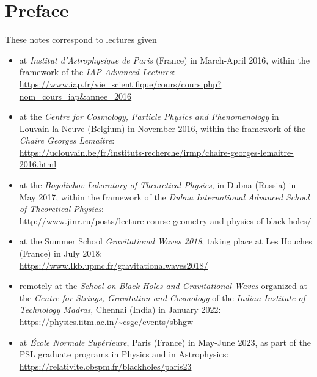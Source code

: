 \chapter*{Preface}

These notes correspond to lectures given
\begin{itemize}
\item at \emph{Institut d'Astrophysique de Paris} (France) in March-April 2016, within the
framework of the \emph{IAP Advanced Lectures}:\\
{\footnotesize\url{https://www.iap.fr/vie_scientifique/cours/cours.php?nom=cours_iap&annee=2016}}
\item at the \emph{Centre for Cosmology, Particle Physics and Phenomenology} in Louvain-la-Neuve
(Belgium) in November 2016, within the framework of the \emph{Chaire Georges Lemaître}:\\
{\footnotesize \url{https://uclouvain.be/fr/instituts-recherche/irmp/chaire-georges-lemaitre-2016.html}}
\item at the
\emph{Bogoliubov Laboratory of Theoretical Physics}, in Dubna (Russia) in May 2017,
within the framework of the \emph{Dubna International Advanced School of Theoretical Physics}:\\
{\footnotesize\url{http://www.jinr.ru/posts/lecture-course-geometry-and-physics-of-black-holes/}}
\item at the Summer School \emph{Gravitational Waves 2018}, taking place at Les Houches
(France) in July 2018:\\
{\footnotesize\url{https://www.lkb.upmc.fr/gravitationalwaves2018/}}
\item remotely at the \emph{School on Black Holes and Gravitational Waves}
organized at the
\emph{Centre for Strings, Gravitation and Cosmology} of the
\emph{Indian Institute of Technology Madras}, Chennai (India) in January 2022:\\
{\footnotesize\url{https://physics.iitm.ac.in/~csgc/events/sbhgw}}
\item at \emph{École Normale Supérieure}, Paris (France) in May-June 2023, as
part of the PSL graduate programs in Physics and in Astrophysics:\\
{\footnotesize\url{https://relativite.obspm.fr/blackholes/paris23}}
\end{itemize}

\vspace{2ex}

